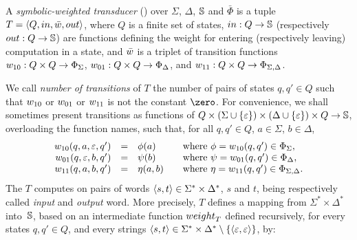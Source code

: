 \begin{definition}
\label{def:transducer} \label{def:SWT}
A \emph{symbolic-weighted transducer} (\SWT)
over $\Sigma$, $\Delta$, $\mathbb{S}$ and $\bar\Phi$
is a tuple
$T = \< Q, \init, \bar{\wei}, \final >$,
where $Q$ is a finite set of states, 
$\mathsf{in} : Q \to \Semiring$   %
(respectively $\mathsf{out} : Q \to \Semiring$)  %
are functions defining the weight for entering
(respectively leaving) computation in a state,  
and $\bar{\wei}$ is a triplet of transition functions 
$\wei_{10}: Q \times Q \to \Phi_{\Sigma}$,
$\wei_{01}: Q \times Q \to \Phi_{\Delta}$, and 
$\wei_{11}: Q \times Q \to \Phi_{\Sigma, \Delta}$.
\end{definition}
%
\noindent
We call \emph{number of transitions} of $T$ the number of pairs of states 
$q, q' \in Q$ such that $\wei_{10}$ or $\wei_{01}$ or $\wei_{11}$
is not the constant $\zero$.
%
\noindent
For convenience, we shall sometimes present transitions 
as functions of  
$Q \times (\Sigma \cup \{ \varepsilon \}) \times (\Delta \cup \{ \varepsilon \}) \times Q \to \mathbb{S}$,
overloading the function names,
such that, for all $q, q' \in Q$, $a \in \Sigma$,  $b \in \Delta$, 
\[
\begin{array}{rcll}
\wei_{10}(q, a, \varepsilon, q') & = & \phi(a) & %
\quad\mathrm{where~} \phi = \wei_{10}(q, q') \in \Phi_\Sigma,\\
\wei_{01}(q, \varepsilon, b, q') & = & \psi(b) & 
\quad\mathrm{where~} \psi = \wei_{01}(q, q') \in \Phi_\Delta,\\
\wei_{11}(q, a, b, q') & = & \eta(a, b) & 
\quad\mathrm{where~} \eta = \wei_{11}(q, q') \in \Phi_{\Sigma, \Delta}.\\
\end{array}      
\]
%
\noindent 
The \SWT $T$ computes on pairs of words $\< s, t> \in \Sigma^* \times \Delta^*$,
$s$ and $t$, being respectively called \emph{input} and \emph{output} word.
More precisely, $T$ defines a mapping 
from $\Sigma^* \times \Delta^*$ into~$\mathbb{S}$,
based on an intermediate function $\weight_T$
defined recursively, for every states $q, q' \in Q$, 
and every strings $\< s, t> \in \Sigma^* \times \Delta^* \setminus \{ \< \varepsilon, \varepsilon >\}$, by:
%
